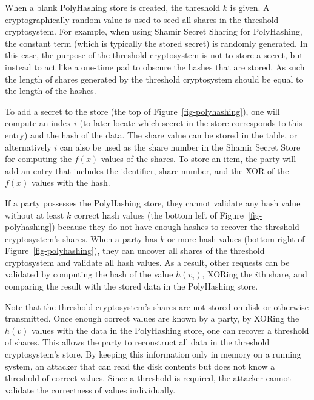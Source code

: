 When a blank PolyHashing store is created, the threshold $k$ is given.  
A cryptographically random value is used to seed all shares in the
threshold cryptosystem.  For example, when using Shamir Secret Sharing for 
PolyHashing, the constant term (which is typically the stored secret) is 
randomly generated.   In this case, the purpose of the threshold cryptosystem 
is not to store a secret, but instead to act like a one-time pad to obscure 
the hashes that are stored.   As such the length of shares generated by 
the threshold cryptosystem should be equal to the length of the hashes.


To add a secret to the store (the top of Figure~\ref{fig-polyhashing}), one 
will compute an index $i$ (to 
later locate which secret in the store corresponds to this entry) and
the hash of the data.   The share value can be stored in the table, or
alternatively $i$ can also be used as the 
share number in the Shamir Secret Store for computing the $f(x)$ values of the
shares.   To store an item, the party will add an entry that includes the 
identifier, share number, and the XOR of the $f(x)$ values 
with the hash.   %



If a party possesses the PolyHashing store, they cannot validate any hash 
value without at least $k$ correct hash values (the bottom left of 
Figure~\ref{fig-polyhashing}) because they do not have enough hashes
to recover the threshold
cryptosystem's shares.  When a party has $k$ or more hash 
values (bottom right of Figure~\ref{fig-polyhashing}), they can 
uncover all shares of the threshold cryptosystem and validate all hash
values.   As a result, other requests can be validated by computing
the hash of the value $h(v_i)$, XORing the $i$th share, and
comparing the result with the stored data in the PolyHashing store.

Note that the threshold cryptosystem's shares are not stored on disk or 
otherwise transmitted.   Once enough correct values are known by a party, by 
XORing the $h(v)$ values with the data in the PolyHashing store, one can 
recover a threshold of shares.   This allows the party to reconstruct all
data in the threshold cryptosystem's store.   By keeping this information
only in memory on a running system, an attacker that can read the disk 
contents but does not know a threshold of correct values.  Since a threshold
is required, the attacker cannot validate
the correctness of values individually.

